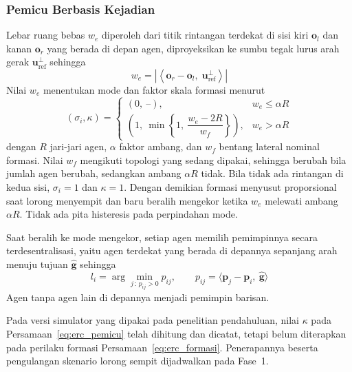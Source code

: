 \documentclass[12pt,a4paper]{report}
\begin{document}
\subsubsection{Pemicu Berbasis Kejadian}

Lebar ruang bebas $w_e$ diperoleh dari titik rintangan terdekat di sisi kiri $\mathbf{o}_l$ dan kanan $\mathbf{o}_r$ yang berada di depan agen, diproyeksikan ke sumbu tegak lurus arah gerak $\mathbf{u}_{\mathrm{ref}}^{\perp}$ sehingga
\begin{equation}
    w_e = \left| \left\langle \mathbf{o}_r - \mathbf{o}_l,\; \mathbf{u}_{\mathrm{ref}}^{\perp} \right\rangle \right|
\end{equation}
Nilai $w_e$ menentukan mode dan faktor skala formasi menurut
\begin{equation}
    (\sigma_i, \kappa) =
    \begin{cases}
        (0,\ \text{--}), & w_e \le \alpha R \\[2pt]
        \left(1,\ \min\left\{1,\ \dfrac{w_e - 2R}{w_f}\right\}\right), & w_e > \alpha R
    \end{cases}
    \label{eq:erc_pemicu}
\end{equation}
dengan $R$ jari-jari agen, $\alpha$ faktor ambang, dan $w_f$ bentang lateral nominal formasi. Nilai $w_f$ mengikuti topologi yang sedang dipakai, sehingga berubah bila jumlah agen berubah, sedangkan ambang $\alpha R$ tidak. Bila tidak ada rintangan di kedua sisi, $\sigma_i = 1$ dan $\kappa = 1$. Dengan demikian formasi menyusut proporsional saat lorong menyempit dan baru beralih mengekor ketika $w_e$ melewati ambang $\alpha R$. Tidak ada pita histeresis pada perpindahan mode.

Saat beralih ke mode mengekor, setiap agen memilih pemimpinnya secara terdesentralisasi, yaitu agen terdekat yang berada di depannya sepanjang arah menuju tujuan $\hat{\mathbf{g}}$ sehingga
\begin{equation}
    l_i = \arg\min_{j\,:\,p_{ij} > 0} p_{ij}, \qquad p_{ij} = \langle \mathbf{p}_j - \mathbf{p}_i,\ \hat{\mathbf{g}} \rangle
\end{equation}
Agen tanpa agen lain di depannya menjadi pemimpin barisan.

Pada versi simulator yang dipakai pada penelitian pendahuluan, nilai $\kappa$ pada Persamaan~\ref{eq:erc_pemicu} telah dihitung dan dicatat, tetapi belum diterapkan pada perilaku formasi Persamaan~\ref{eq:erc_formasi}. Penerapannya beserta pengulangan skenario lorong sempit dijadwalkan pada Fase~1.
\end{document}
